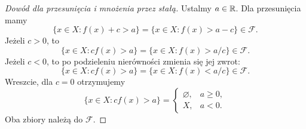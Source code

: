 \begin{proof}[Dowód dla przesunięcia i mnożenia przez stałą]
Ustalmy $a\in\mathbb{R}$. Dla przesunięcia mamy
\[
  \{x\in X:f(x)+c>a\}
  =\{x\in X:f(x)>a-c\}\in\mathcal{F}.
\]
Jeżeli $c>0$, to
\[
  \{x\in X:cf(x)>a\}
  =\{x\in X:f(x)>a/c\}\in\mathcal{F}.
\]
Jeżeli $c<0$, to po podzieleniu nierówności zmienia się jej zwrot:
\[
  \{x\in X:cf(x)>a\}
  =\{x\in X:f(x)<a/c\}\in\mathcal{F}.
\]
Wreszcie, dla $c=0$ otrzymujemy
\[
  \{x\in X:cf(x)>a\}
  =\begin{cases}
    \varnothing, & a\geq0,\\
    X, & a<0.
  \end{cases}
\]
Oba zbiory należą do $\mathcal{F}$.
\end{proof}
